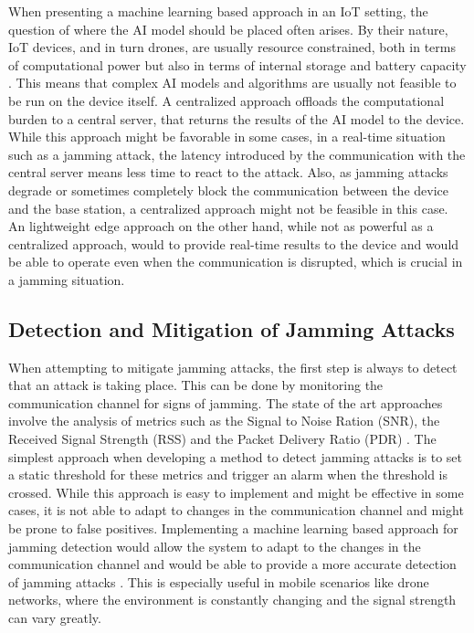 \documentclass[futureinternet,article,submit,pdftex,moreauthors]{Definitions/mdpi}
\begin{document}
When presenting a machine learning based approach in an IoT setting, the question of where the AI model should be placed often arises. By their nature, IoT devices, and in turn drones, are usually resource constrained, 
both in terms of computational power but also in terms of internal storage and battery capacity \cite{6GSecurity-Chorti}. This means that complex AI models and algorithms are usually not feasible to be run on the device itself. A centralized approach 
offloads the computational burden to a central server, that returns the results of the AI model to the device. While this approach might be favorable in some cases, in a real-time situation such as a jamming attack, the latency introduced by the
communication with the central server means less time to react to the attack. Also, as jamming attacks degrade or sometimes completely block the communication between the device and the base station, a centralized approach might not be feasible in this case.
An lightweight edge approach on the other hand, while not as powerful as a centralized approach, would to provide real-time results to the device and would be able to operate even when the communication is disrupted, which is crucial in a jamming situation. 

\subsection{Detection and Mitigation of Jamming Attacks}\label{sec:DetectionMitigation}

When attempting to mitigate jamming attacks, the first step is always to detect that an attack is taking place. This can be done by monitoring the communication channel for signs of jamming. 
The state of the art approaches involve the analysis of metrics such as the Signal to Noise Ration (SNR), the Received Signal Strength (RSS) and the Packet Delivery Ratio (PDR) \cite{JammingDetection-Sciancalepore}. The simplest approach when 
developing a method to detect jamming attacks is to set a static threshold for these metrics and trigger an alarm when the threshold is crossed. While this approach is easy to implement and might be effective in some cases, it is not able to adapt to changes in the communication channel and might be prone to false positives.
Implementing a machine learning based approach for jamming detection would allow the system to adapt to the changes in the communication channel and would be able to provide a more accurate detection of jamming attacks \cite{VANETsAI-Lyamin}. This is especially useful in mobile scenarios like 
drone networks, where the environment is constantly changing and the signal strength can vary greatly. 
\end{document}
